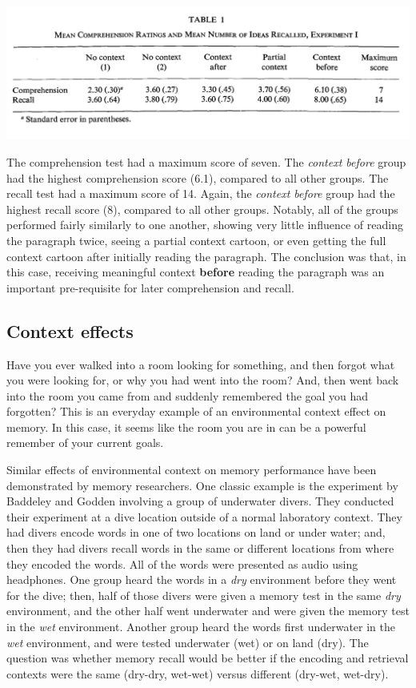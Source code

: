 \documentclass[
  oneside,
  12pt]{crumpbook}
\begin{document}
\begin{center}\includegraphics[width=1\linewidth]{imgs/Bransford_data} \end{center}

The comprehension test had a maximum score of seven. The \emph{context before} group had the highest comprehension score (6.1), compared to all other groups. The recall test had a maximum score of 14. Again, the \emph{context before} group had the highest recall score (8), compared to all other groups. Notably, all of the groups performed fairly similarly to one another, showing very little influence of reading the paragraph twice, seeing a partial context cartoon, or even getting the full context cartoon after initially reading the paragraph. The conclusion was that, in this case, receiving meaningful context \textbf{before} reading the paragraph was an important pre-requisite for later comprehension and recall.

\hypertarget{context-effects}{%
\subsection{Context effects}\label{context-effects}}

Have you ever walked into a room looking for something, and then forgot what you were looking for, or why you had went into the room? And, then went back into the room you came from and suddenly remembered the goal you had forgotten? This is an everyday example of an environmental context effect on memory. In this case, it seems like the room you are in can be a powerful remember of your current goals.

Similar effects of environmental context on memory performance have been demonstrated by memory researchers. One classic example is the experiment by Baddeley and Godden involving a group of underwater divers. They conducted their experiment at a dive location outside of a normal laboratory context. They had divers encode words in one of two locations on land or under water; and, then they had divers recall words in the same or different locations from where they encoded the words. All of the words were presented as audio using headphones. One group heard the words in a \emph{dry} environment before they went for the dive; then, half of those divers were given a memory test in the same \emph{dry} environment, and the other half went underwater and were given the memory test in the \emph{wet} environment. Another group heard the words first underwater in the \emph{wet} environment, and were tested underwater (wet) or on land (dry). The question was whether memory recall would be better if the encoding and retrieval contexts were the same (dry-dry, wet-wet) versus different (dry-wet, wet-dry).
\end{document}
